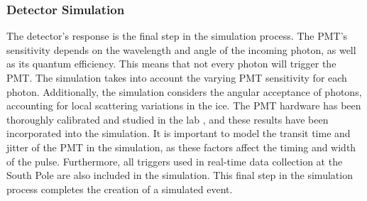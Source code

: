 \subsubsection*{Detector Simulation}
The detector's response is the final step in the simulation process. The PMT's sensitivity depends on the wavelength and angle of the incoming photon, as well as its quantum efficiency. This means that not every photon will trigger the PMT. The simulation takes into account the varying PMT sensitivity for each photon. Additionally, the simulation considers the angular acceptance of photons, accounting for local scattering variations in the ice. The PMT hardware has been thoroughly calibrated and studied in the lab , and these results have been incorporated into the simulation. It is important to model the transit time and jitter of the PMT in the simulation, as these factors affect the timing and width of the pulse. Furthermore, all triggers used in real-time data collection at the South Pole are also included in the simulation. This final step in the simulation process completes the creation of a simulated event.


